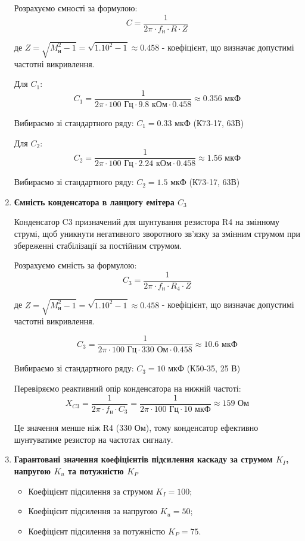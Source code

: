 \documentclass[main.tex]{subfiles}
\begin{document}
\begin{enumerate}
Розрахуємо ємності за формулою:
\[C = \frac{1}{2\pi \cdot f_{\text{н}} \cdot R \cdot Z}\]

де $Z = \sqrt{M_{\text{н}}^2 - 1} = \sqrt{1.10^2 - 1} \approx 0.458$ - коефіцієнт, що визначає допустимі частотні викривлення.

Для $C_1$:
\[C_1 = \frac{1}{2\pi \cdot 100\text{ Гц} \cdot 9.8\text{ кОм} \cdot 0.458} \approx 0.356\text{ мкФ}\]

Вибираємо зі стандартного ряду: $C_1 = 0.33\text{ мкФ}$ (К73-17, 63В)

Для $C_2$:
\[C_2 = \frac{1}{2\pi \cdot 100\text{ Гц} \cdot 2.24\text{ кОм} \cdot 0.458} \approx 1.56\text{ мкФ}\]

Вибираємо зі стандартного ряду: $C_2 = 1.5\text{ мкФ}$ (К73-17, 63В)

\item \textbf{Ємність конденсатора в ланцюгу емітера $C_3$} \newline

Конденсатор C3 призначений для шунтування резистора R4 на змінному струмі, щоб уникнути негативного зворотного зв'язку за змінним струмом при збереженні стабілізації за постійним струмом.

Розрахуємо ємність за формулою:
\[C_3 = \frac{1}{2\pi \cdot f_{\text{н}} \cdot R_4 \cdot Z}\]

де $Z = \sqrt{M_{\text{н}}^2 - 1} = \sqrt{1.10^2 - 1} \approx 0.458$ - коефіцієнт, що визначає допустимі частотні викривлення.

\[C_3 = \frac{1}{2\pi \cdot 100\text{ Гц} \cdot 330\text{ Ом} \cdot 0.458} \approx 10.6\text{ мкФ}\]

Вибираємо зі стандартного ряду: $C_3 = 10\text{ мкФ}$ (К50-35, 25 В)

Перевіряємо реактивний опір конденсатора на нижній частоті:
\[X_{C3} = \frac{1}{2\pi \cdot f_{\text{н}} \cdot C_3} = \frac{1}{2\pi \cdot 100\text{ Гц} \cdot 10\text{ мкФ}} \approx 159\text{ Ом}\]

Це значення менше ніж R4 (330 Ом), тому конденсатор ефективно шунтуватиме резистор на частотах сигналу.

\item \textbf{Гарантовані значення коефіцієнтів підсилення каскаду за струмом $K_I$, напругою $K_u$ та потужністю $K_P$} \newline

\begin{itemize}
    \item Коефіцієнт підсилення за струмом $K_I = 100$;
    \item Коефіцієнт підсилення за напругою $K_u = 50$;
    \item Коефіцієнт підсилення за потужністю $K_P = 75$.
\end{itemize}



\end{enumerate}
\end{document}
